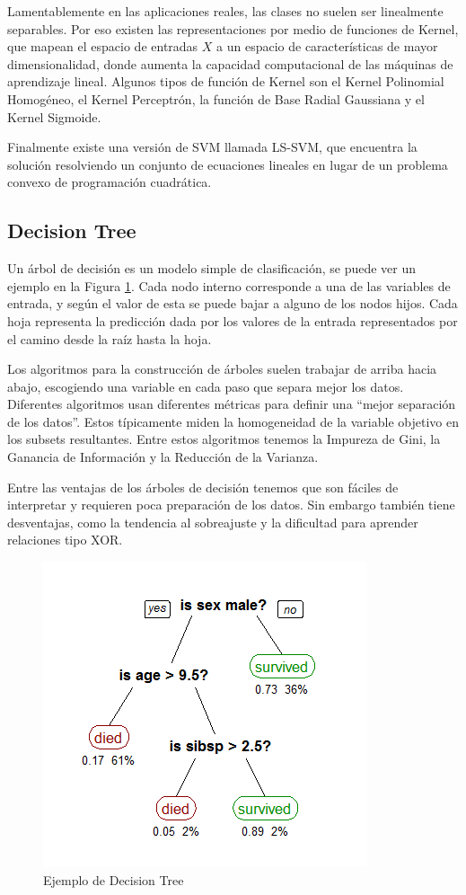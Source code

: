 Lamentablemente en las aplicaciones reales, las clases no suelen ser linealmente separables. Por eso existen las representaciones por medio de funciones de Kernel, que mapean el espacio de entradas $X$ a un espacio de características de mayor dimensionalidad, donde aumenta la capacidad computacional de las máquinas de aprendizaje lineal. Algunos tipos de función de Kernel son el Kernel Polinomial Homogéneo, el Kernel Perceptrón, la función de Base Radial Gaussiana y el Kernel Sigmoide.

Finalmente existe una versión de \ac{SVM} llamada \ac{LS-SVM}, que encuentra la solución resolviendo un conjunto de ecuaciones lineales en lugar de un problema convexo de programación cuadrática.

\subsection{Decision Tree}

Un árbol de decisión es un modelo simple de clasificación, se puede ver un ejemplo en la Figura \ref{fig:dt-eg}. Cada nodo interno corresponde a una de las variables de entrada, y según el valor de esta se puede bajar a alguno de los nodos hijos. Cada hoja representa la predicción dada por los valores de la entrada representados por el camino desde la raíz hasta la hoja.

Los algoritmos para la construcción de árboles suelen trabajar de arriba hacia abajo, escogiendo una variable en cada paso que separa mejor los datos. Diferentes algoritmos usan diferentes métricas para definir una ``mejor separación de los datos''. Estos típicamente miden la homogeneidad de la variable objetivo en los subsets resultantes. Entre estos algoritmos tenemos la Impureza de Gini, la Ganancia de Información y la Reducción de la Varianza.

Entre las ventajas de los árboles de decisión tenemos que son fáciles de interpretar y requieren poca preparación de los datos. Sin embargo también tiene desventajas, como la tendencia al sobreajuste y la dificultad para aprender relaciones tipo XOR.

\begin{figure}
    \centering
    \caption{Ejemplo de Decision Tree}
    \label{fig:dt-eg}
    \includegraphics[width=0.6\linewidth]{graficos/dt_example.png}
\end{figure}

